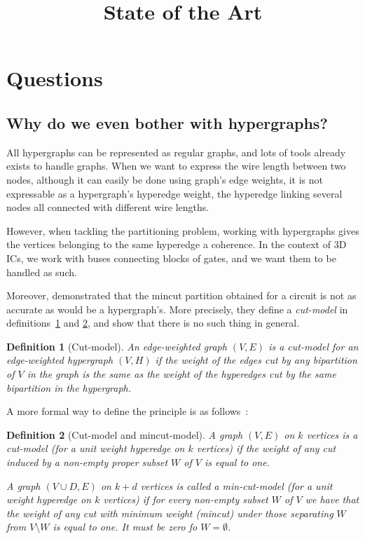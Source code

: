 \documentclass[12pt,a4paper]{article}
\title{State of the Art}
\theoremstyle{customdef}
\newtheorem{definition}{Definition}
\begin{document}
\maketitle
\tableofcontents

\section{Questions}
\subsection{Why do we even bother with hypergraphs?}
All hypergraphs can be represented as regular graphs, and lots of tools already exists to handle graphs.
When we want to express the wire length between two nodes, although it can easily be done using graph's edge weights, it is not expressable as a hypergraph's hyperedge weight, the hyperedge linking several nodes all connected with different wire lengths.

However, when tackling the partitioning problem, working with hypergraphs gives the vertices belonging to the same hyperedge a coherence.
In the context of 3D ICs, we work with buses connecting blocks of gates, and we want them to be handled as such.

Moreover, \citet{Ihler1993} demonstrated that the mincut partition obtained for a circuit is not as accurate as would be a hypergraph's.
More precisely, they define a \textit{cut-model} in definitions~\ref{def:cut-model} and \ref{def:cut-model-formal}, and show that there is no such thing in general.

\begin{definition}[Cut-model]\label{def:cut-model}
An edge-weighted graph $(V,E)$ is a cut-model for an edge-weighted hypergraph $(V,H)$ if the weight of the edges cut by any bipartition of $V$ in the graph is the same as the weight of the hyperedges cut by the same bipartition in the hypergraph.
\end{definition}

A more formal way to define the principle is as follows~:
\begin{definition}[Cut-model and mincut-model]\label{def:cut-model-formal}
A graph $(V, E)$ on $k$ vertices is a cut-model (for a unit weight hyperedge on $k$ vertices) if the weight of any cut induced by a non-empty proper subset $W$ of $V$ is equal to one.

A graph $(V \cup D,E)$ on $k+d$ vertices is called a min-cut-model (for a unit weight hyperedge on $k$ vertices) if for every non-empty subset $W$ of $V$ we have that the weight of any cut with minimum weight (mincut) under those separating $W$ from $V \setminus W$ is equal to one.
It must be zero fo $W=\emptyset$.%
\end{definition}
\end{document}
